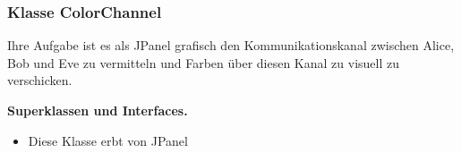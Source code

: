 \documentclass{article}
\begin{document}
	\subsubsection{Klasse ColorChannel}
    Ihre Aufgabe ist es als JPanel grafisch den\newline
    Kommunikationskanal zwischen Alice, Bob und Eve\newline
    zu vermitteln und Farben über diesen Kanal zu visuell\newline
    zu verschicken.\newline

	    \textbf{Superklassen und Interfaces.}\newline
	   \begin{itemize}
            \item Diese Klasse erbt von JPanel\newline
           \end{itemize}
\end{document}
